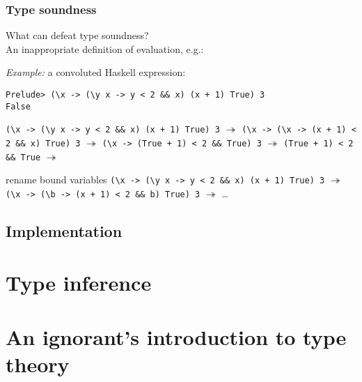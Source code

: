 \documentclass{beamer}
\begin{document}
\begin{frame}[fragile]\frametitle{Type soundness}

  What can defeat type soundness?\\
  An inappropriate definition of evaluation, e.g.: 
  
  \emph{Example:} a convoluted Haskell expression:
  \begin{verbatim}
Prelude> (\x -> (\y x -> y < 2 && x) (x + 1) True) 3
False
  \end{verbatim}
\vspace{-4mm}  
\verb|(\x -> (\y x -> y < 2 && x) (x + 1) True) 3| $\twoheadrightarrow$
\verb|(\x -> (\x -> (x + 1) < 2 && x) True) 3| $\twoheadrightarrow$
\verb|(\x -> (True + 1) < 2 && True) 3| $\twoheadrightarrow$ 
\verb|(True + 1) < 2 && True| $\twoheadrightarrow$ \faFlash

\vspace{2mm}
   rename bound variables
\verb|(\x -> (\y x -> y < 2 && x) (x + 1) True) 3| $\twoheadrightarrow$
\verb|(\x -> (\b -> (x + 1) < 2 && b) True) 3| $\twoheadrightarrow$ \dots


\end{frame}

\subsection{Implementation}



\section{Type inference}



\section{An ignorant's introduction to type theory}






\end{document}

